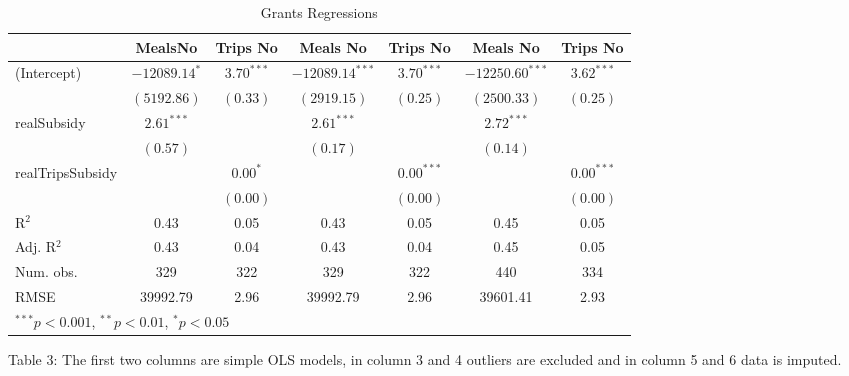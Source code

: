 \documentclass[12pt, a4paper]{article}\usepackage[]{graphicx}\usepackage[]{color}
\begin{document}
\begin{table}
\begin{center}
\begin{tabular}{l c c c c c c }
\hline
 & MealsNo & Trips No & Meals No & Trips No & Meals No & Trips No \\
\hline
(Intercept)      & $-12089.14^{*}$ & $3.70^{***}$ & $-12089.14^{***}$ & $3.70^{***}$ & $-12250.60^{***}$ & $3.62^{***}$ \\
                 & $(5192.86)$     & $(0.33)$     & $(2919.15)$       & $(0.25)$     & $(2500.33)$       & $(0.25)$     \\
realSubsidy      & $2.61^{***}$    &              & $2.61^{***}$      &              & $2.72^{***}$      &              \\
                 & $(0.57)$        &              & $(0.17)$          &              & $(0.14)$          &              \\
realTripsSubsidy &                 & $0.00^{*}$   &                   & $0.00^{***}$ &                   & $0.00^{***}$ \\
                 &                 & $(0.00)$     &                   & $(0.00)$     &                   & $(0.00)$     \\
\hline
R$^2$            & 0.43            & 0.05         & 0.43              & 0.05         & 0.45              & 0.05         \\
Adj. R$^2$       & 0.43            & 0.04         & 0.43              & 0.04         & 0.45              & 0.05         \\
Num. obs.        & 329             & 322          & 329               & 322          & 440               & 334          \\
RMSE             & 39992.79        & 2.96         & 39992.79          & 2.96         & 39601.41          & 2.93         \\
\hline
\multicolumn{7}{l}{\scriptsize{$^{***}p<0.001$, $^{**}p<0.01$, $^*p<0.05$}}
\end{tabular}
\caption{Grants Regressions}
\label{table:coefficients}
\end{center}
\end{table}

Table 3: The first two columns are simple OLS models, in column 3 and 4 outliers are excluded and in column 5 and 6 data is imputed.  
\end{document}
